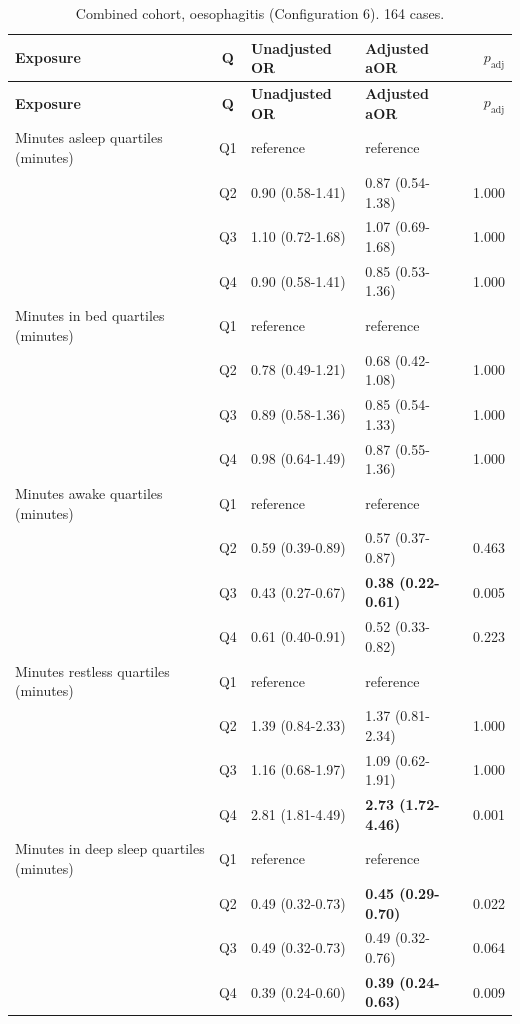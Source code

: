 \documentclass[11pt]{article}
\begin{document}
\begin{longtable}{@{}p{5.2cm}c p{3.0cm} p{3.0cm} r@{}}
\caption{Combined cohort, oesophagitis (Configuration 6). 164 cases.}\label{tab:res-comb-eso}\\
\toprule \textbf{Exposure} & \textbf{Q} & \textbf{Unadjusted OR} & \textbf{Adjusted aOR} & \textbf{$p_{\text{adj}}$} \\ \midrule
\endfirsthead \toprule \textbf{Exposure} & \textbf{Q} & \textbf{Unadjusted OR} & \textbf{Adjusted aOR} & \textbf{$p_{\text{adj}}$} \\ \midrule \endhead
Minutes asleep quartiles (minutes) & Q1 & reference & reference & \\
 & Q2 & 0.90 (0.58-1.41) & 0.87 (0.54-1.38) & 1.000 \\
 & Q3 & 1.10 (0.72-1.68) & 1.07 (0.69-1.68) & 1.000 \\
 & Q4 & 0.90 (0.58-1.41) & 0.85 (0.53-1.36) & 1.000 \\
\addlinespace
Minutes in bed quartiles (minutes) & Q1 & reference & reference & \\
 & Q2 & 0.78 (0.49-1.21) & 0.68 (0.42-1.08) & 1.000 \\
 & Q3 & 0.89 (0.58-1.36) & 0.85 (0.54-1.33) & 1.000 \\
 & Q4 & 0.98 (0.64-1.49) & 0.87 (0.55-1.36) & 1.000 \\
\addlinespace
Minutes awake quartiles (minutes) & Q1 & reference & reference & \\
 & Q2 & 0.59 (0.39-0.89) & 0.57 (0.37-0.87) & 0.463 \\
 & Q3 & 0.43 (0.27-0.67) & \textbf{0.38 (0.22-0.61)} & 0.005 \\
 & Q4 & 0.61 (0.40-0.91) & 0.52 (0.33-0.82) & 0.223 \\
\addlinespace
Minutes restless quartiles (minutes) & Q1 & reference & reference & \\
 & Q2 & 1.39 (0.84-2.33) & 1.37 (0.81-2.34) & 1.000 \\
 & Q3 & 1.16 (0.68-1.97) & 1.09 (0.62-1.91) & 1.000 \\
 & Q4 & 2.81 (1.81-4.49) & \textbf{2.73 (1.72-4.46)} & 0.001 \\
\addlinespace
Minutes in deep sleep quartiles (minutes) & Q1 & reference & reference & \\
 & Q2 & 0.49 (0.32-0.73) & \textbf{0.45 (0.29-0.70)} & 0.022 \\
 & Q3 & 0.49 (0.32-0.73) & 0.49 (0.32-0.76) & 0.064 \\
 & Q4 & 0.39 (0.24-0.60) & \textbf{0.39 (0.24-0.63)} & 0.009 \\

\end{longtable}
\end{document}

